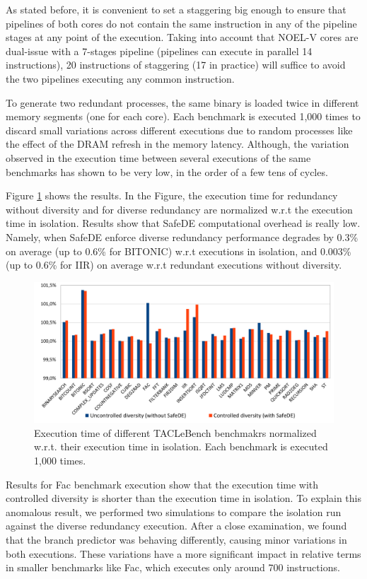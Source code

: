 As stated before, it is convenient to set a staggering big enough to ensure that pipelines of both cores do not contain the same instruction in any of the pipeline stages at any point of the execution. Taking into account that NOEL-V cores are dual-issue with a 7-stages pipeline (pipelines can execute in parallel 14 instructions), 20 instructions of staggering (17 in practice) will suffice to avoid the two pipelines executing any common instruction. 

To generate two redundant processes, the same binary is loaded twice in different memory segments (one for each core). Each benchmark is executed 1,000 times to discard small variations across different executions due to random processes like the effect of the DRAM refresh in the memory latency. Although, the variation observed in the execution time between several executions of the same benchmarks has shown to be very low, in the order of a few tens of cycles.

Figure \ref{fig:tacle_results} shows the results. In the Figure, the execution time for redundancy without diversity and for diverse redundancy are normalized w.r.t the execution time in isolation. Results show that SafeDE computational overhead is really low. Namely, when SafeDE enforce diverse redundancy performance degrades by 0.3\% on average (up to 0.6\% for BITONIC) w.r.t executions in isolation, and 0.003\% (up to 0.6\% for IIR) on average w.r.t redundant executions without diversity. 

\begin{figure}[h]
    \centering
    \includegraphics[scale=0.6]{img/tacle_results.png}
    \caption{Execution time of different TACLeBench benchmakrs normalized w.r.t. their execution time in isolation. Each benchmark is executed 1,000 times.}
    \label{fig:tacle_results}
\end{figure}


Results for Fac benchmark execution show that the execution time with controlled diversity is shorter than the execution time in isolation. To explain this anomalous result, we performed two simulations to compare the isolation run against the diverse redundancy execution. After a close examination, we found that the branch predictor was behaving differently, causing minor variations in both executions. These variations have a more significant impact in relative terms in smaller benchmarks like Fac, which executes only around 700 instructions. 


